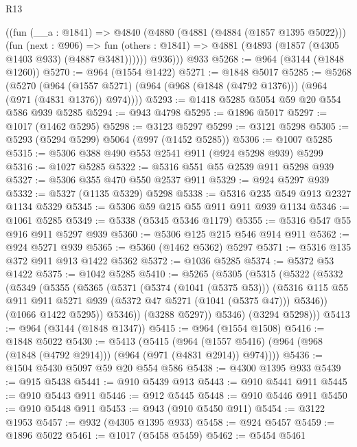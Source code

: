 \begin{lexlean}{R13}
\begin{coremodule}
        ((fun (__a : @1841) =>
        @4840
          (@4880
            (@4881 (@4884 (@1857 @1395 @5022)))
            (fun (next : @906) =>
            fun (others : @1841) => @4881 (@4893 (@1857 (@4305 @1403 @933) (@4887 @3481))))))
          @936)))
    @933
@5268 := @964 (@3144 (@1848 @1260))
@5270 := @964 (@1554 @1422)
@5271 := @1848 @5017
@5285 := @5268
    (@5270
      (@964 (@1557 @5271) (@964 (@968 (@1848 (@4792 @1376))) (@964 (@971 (@4831 @1376)) @974))))
@5293 := @1418 @5285 @5054 @59 @20 @554 @586 @939 @5285
@5294 := @943 @4798
@5295 := @1896 @5017
@5297 := @1017 (@1462 @5295)
@5298 := @3123 @5297
@5299 := @3121 @5298
@5305 := @5293 (@5294 @5299) @5064 (@997 (@1452 @5285))
@5306 := @1007 @5285
@5315 := @5306 @388 @490 @553 @2541 @911 (@924 @5298 @939) @5299
@5316 := @1027 @5285
@5322 := @5316 @551 @55 @2539 @911 @5298 @939
@5327 := @5306 @355 @470 @550 @2537 @911
@5329 := @924 @5297 @939
@5332 := @5327 (@1135 @5329) @5298
@5338 := @5316 @235 @549 @913 @2327 @1134 @5329
@5345 := @5306 @59 @215 @55 @911 @911 @939 @1134
@5346 := @1061 @5285
@5349 := @5338 (@5345 @5346 @1179)
@5355 := @5316 @547 @55 @916 @911 @5297 @939
@5360 := @5306 @125 @215 @546 @914 @911
@5362 := @924 @5271 @939
@5365 := @5360 (@1462 @5362) @5297
@5371 := @5316 @135 @372 @911 @913 @1422 @5362
@5372 := @1036 @5285
@5374 := @5372 @53 @1422
@5375 := @1042 @5285
@5410 := @5265
    (@5305
      (@5315
        (@5322
          (@5332
            (@5349
              (@5355
                (@5365
                  (@5371
                    (@5374 (@1041 (@5375 @53)))
                    (@5316
                      @115
                      @55
                      @911
                      @911
                      @5271
                      @939
                      (@5372 @47 @5271 (@1041 (@5375 @47)))
                      @5346))
                  (@1066 @1422 @5295))
                @5346))
            (@3288 @5297))
          @5346)
        (@3294 @5298)))
@5413 := @964 (@3144 (@1848 @1347))
@5415 := @964 (@1554 @1508)
@5416 := @1848 @5022
@5430 := @5413
    (@5415
      (@964 (@1557 @5416) (@964 (@968 (@1848 (@4792 @2914))) (@964 (@971 (@4831 @2914)) @974))))
@5436 := @1504 @5430 @5097 @59 @20 @554 @586
@5438 := @4300 @1395 @933
@5439 := @915 @5438
@5441 := @910 @5439 @913
@5443 := @910 @5441 @911
@5445 := @910 @5443 @911
@5446 := @912 @5445
@5448 := @910 @5446 @911
@5450 := @910 @5448 @911
@5453 := @943 (@910 @5450 @911)
@5454 := @3122 @1953
@5457 := @932 (@4305 @1395 @933)
@5458 := @924 @5457
@5459 := @1896 @5022
@5461 := @1017 (@5458 @5459)
@5462 := @5454 @5461

\end{coremodule}
\end{lexlean}

